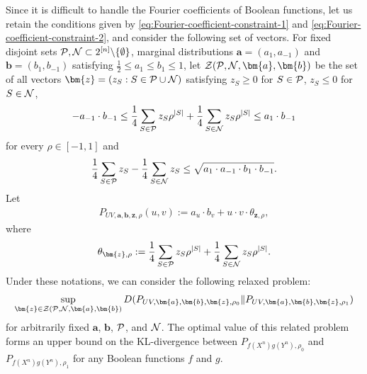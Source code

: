 \documentclass[journal,draftcls, onecolumn]{IEEEtran}
\begin{document}
Since it is difficult to handle the Fourier coefficients of Boolean functions, let us retain the 
conditions given by \eqref{eq:Fourier-coefficient-constraint-1} and \eqref{eq:Fourier-coefficient-constraint-2}, and consider the following set of vectors. 
For fixed disjoint sets ${\cal P}, {\cal N} \subset 2^{[n]}\backslash \{\emptyset\}$, marginal
distributions $\bm{a}=(a_1,a_{-1})$ and $\bm{b}=(b_1,b_{-1})$ satisfying 
$\frac{1}{2} \le a_1 \le b_1 \le 1$, 
let ${\cal Z}({\cal P},{\cal N},\bm{a},\bm{b})$ be the set of all
vectors $\bm{z} = (z_S: S \in {\cal P}\cup {\cal N})$ satisfying $z_S \ge 0$ for $S \in {\cal P}$, $z_S \le 0$ for $S \in {\cal N}$,
\begin{align} \label{eq:condition-z}
- a_{-1}\cdot b_{-1} \le \frac{1}{4} \sum_{S \in {\cal P}} z_S \rho^{|S|}+ \frac{1}{4} \sum_{S \in {\cal N}} z_S \rho^{|S|} \le a_1 \cdot b_{-1}
\end{align}
for every $\rho \in [-1,1]$
and
\begin{align} \label{eq:condition-z-2}
\frac{1}{4} \sum_{S \in {\cal P}} z_S - \frac{1}{4} \sum_{S \in {\cal N}} z_S 
 \le \sqrt{a_1 \cdot a_{-1} \cdot b_1 \cdot b_{-1}}.
\end{align}
Let 
\begin{align*}
P_{UV, \bm{a},\bm{b},\bm{z},\rho}(u,v) := a_u\cdot b_v + u\cdot v \cdot \theta_{\bm{z},\rho},
\end{align*}
where 
\begin{align*}
\theta_{\bm{z},\rho} := \frac{1}{4} \sum_{S \in {\cal P}} z_S \rho^{|S|} + \frac{1}{4} \sum_{S\in {\cal N}} z_S \rho^{|S|}.
\end{align*}
Under these notations, we can consider the following relaxed problem:
\begin{align} \label{eq:relaxed-optimization}
\sup_{\bm{z} \in {\cal Z}({\cal P},{\cal N},\bm{a},\bm{b})} 
 D(P_{UV, \bm{a},\bm{b},\bm{z},\rho_0} \| P_{UV, \bm{a},\bm{b},\bm{z},\rho_1})
\end{align}
for arbitrarily fixed $\bm{a}$, $\bm{b}$, ${\cal P}$, and ${\cal N}$. The optimal value of this related problem forms an upper bound on the KL-divergence between
$P_{f(X^n)g(Y^n),\rho_0}$ and $P_{f(X^n)g(Y^n),\rho_1}$ for  any Boolean functions $f$ and $g$.
\end{document}
